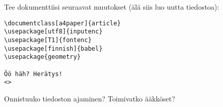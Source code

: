     \begin{harj}
        Tee dokumenttiisi seuraavat muutokset (älä siis luo uutta tiedostoa):
        \begin{lstlisting}
\documentclass[a4paper]{article}
\usepackage[utf8]{inputenc}
\usepackage[T1]{fontenc}
\usepackage[finnish]{babel}
\usepackage{geometry}

Öö häh? Herätys!
<>
        \end{lstlisting}
    Onnistuuko tiedoston ajaminen? Toimivatko ääkköset?
    \end{harj}
